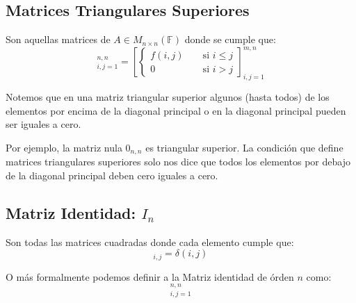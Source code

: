 \documentclass[12pt, fleqn]{report}                             %
\DeclareMathOperator \Space {\quad}                             %
\DeclareMathOperator \MiniSpace {\;}                            %
\newcommand{\Brackets}[1]{\left[ #1 \right]}                    %
\begin{document}
            \clearpage
            \subsection{Matrices Triangulares Superiores}

                Son aquellas matrices de $A \in M_{n \times n}(\mathbb{F})$ donde se cumple que: 
                \begin{equation}
                    [f(i,j)]_{i, j = 1}^{n, n} =
                    \Brackets{
                        \begin{cases}
                            f(i,j)  \MiniSpace& \text{ si } i \leq j \\
                            0       \MiniSpace& \text{ si } i > j
                        \end{cases}
                    }_{i, j = 1}^{m, n}  
                \end{equation}


                Notemos que en una matriz triangular superior algunos (hasta todos) de los elementos por encima de la diagonal
                principal o en la diagonal principal pueden ser iguales a cero.

                Por ejemplo, la matriz nula $0_{n,n}$ es triangular superior. La condición que define matrices triangulares
                superiores solo nos dice que todos los elementos por debajo de la diagonal principal deben cero iguales a cero.


            \clearpage
            \subsection{Matriz Identidad: $I_n$}

                Son todas las matrices cuadradas donde cada elemento cumple que:
                \begin{equation}
                    [I]_{i,j} = \delta(i,j)
                \end{equation}

                O más formalmente podemos definir a la Matriz identidad de órden $n$ como:
                \begin{equation}
                    [\delta(i,j)]_{i, j = 1}^{n, n}
                \end{equation}
\end{document}
